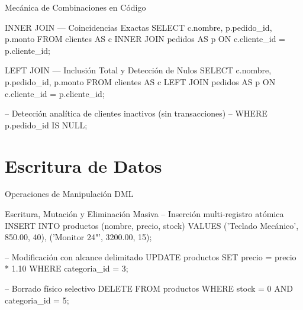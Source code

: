 \documentclass[12pt, aspectratio=169, UTF8]{beamer}
\begin{document}
\begin{frame}[fragile]{Mecánica de Combinaciones en Código}
  \begin{sqlbox}{INNER JOIN — Coincidencias Exactas}
SELECT c.nombre, p.pedido_id, p.monto
FROM clientes AS c
INNER JOIN pedidos AS p ON c.cliente_id = p.cliente_id;
  \end{sqlbox}
  \vspace{4pt}
  \begin{sqlbox}{LEFT JOIN — Inclusión Total y Detección de Nulos}
SELECT c.nombre, p.pedido_id, p.monto
FROM clientes AS c
LEFT JOIN pedidos AS p ON c.cliente_id = p.cliente_id;

-- Detección analítica de clientes inactivos (sin transacciones)
-- WHERE p.pedido_id IS NULL;
  \end{sqlbox}
\end{frame}

\section{Escritura de Datos}

\begin{frame}[fragile]{Operaciones de Manipulación DML}
  \begin{sqlbox}{Escritura, Mutación y Eliminación Masiva}
-- Inserción multi-registro atómica
INSERT INTO productos (nombre, precio, stock) VALUES 
('Teclado Mecánico', 850.00, 40),
('Monitor 24"', 3200.00, 15);

-- Modificación con alcance delimitado
UPDATE productos 
SET precio = precio * 1.10 
WHERE categoria_id = 3;

-- Borrado físico selectivo
DELETE FROM productos 
WHERE stock = 0 AND categoria_id = 5;
  \end{sqlbox}
\end{frame}
\end{document}
